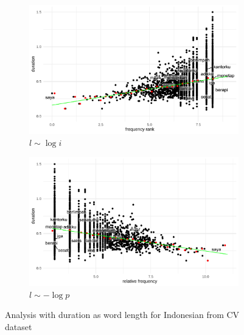 \begin{figure}[H]
  \centering
  \begin{subfigure}[b]{0.48\textwidth}
    \centering
    \includegraphics[width=\textwidth]{plots/Indonesian_logi_d_CV.pdf}
    \caption{$l \sim \log i$}
  \end{subfigure}
  \hfill
  \begin{subfigure}[b]{0.48\textwidth}
    \centering
    \includegraphics[width=\textwidth]{plots/Indonesian_logp_d_CV.pdf}
    \caption{$l \sim -\log p$}
  \end{subfigure}
  \caption{Analysis with duration as word length for Indonesian from CV dataset}
\end{figure}

